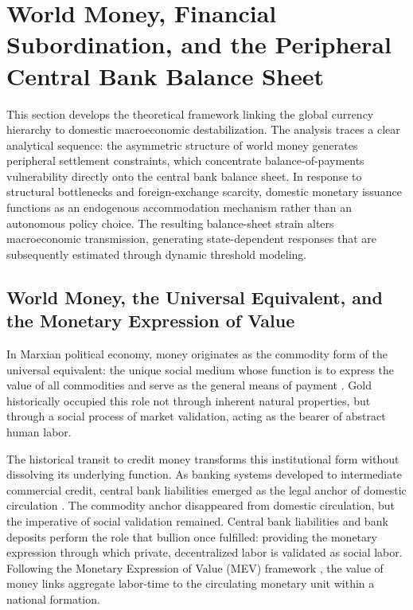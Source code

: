 \section{World Money, Financial Subordination, and the Peripheral Central Bank Balance Sheet}
\label{sec:macro_framework}

This section develops the theoretical framework linking the global currency hierarchy to domestic macroeconomic destabilization. The analysis traces a clear analytical sequence: the asymmetric structure of world money generates peripheral settlement constraints, which concentrate balance-of-payments vulnerability directly onto the central bank balance sheet. In response to structural bottlenecks and foreign-exchange scarcity, domestic monetary issuance functions as an endogenous accommodation mechanism rather than an autonomous policy choice. The resulting balance-sheet strain alters macroeconomic transmission, generating state-dependent responses that are subsequently estimated through dynamic threshold modeling.

\subsection{World Money, the Universal Equivalent, and the Monetary Expression of Value}
\label{sec:B1_worldmoney_mev}

In Marxian political economy, money originates as the commodity form of the universal equivalent: the unique social medium whose function is to express the value of all commodities and serve as the general means of payment \citep[\S3.1]{Basu2022}. Gold historically occupied this role not through inherent natural properties, but through a social process of market validation, acting as the bearer of abstract human labor. 

The historical transit to credit money transforms this institutional form without dissolving its underlying function. As banking systems developed to intermediate commercial credit, central bank liabilities emerged as the legal anchor of domestic circulation \citep[\S3.2.3]{Basu2022}. The commodity anchor disappeared from domestic circulation, but the imperative of social validation remained. Central bank liabilities and bank deposits perform the role that bullion once fulfilled: providing the monetary expression through which private, decentralized labor is validated as social labor. Following the Monetary Expression of Value (MEV) framework \citep{Foley1982,Basu2022}, the value of money links aggregate labor-time to the circulating monetary unit within a national formation.

